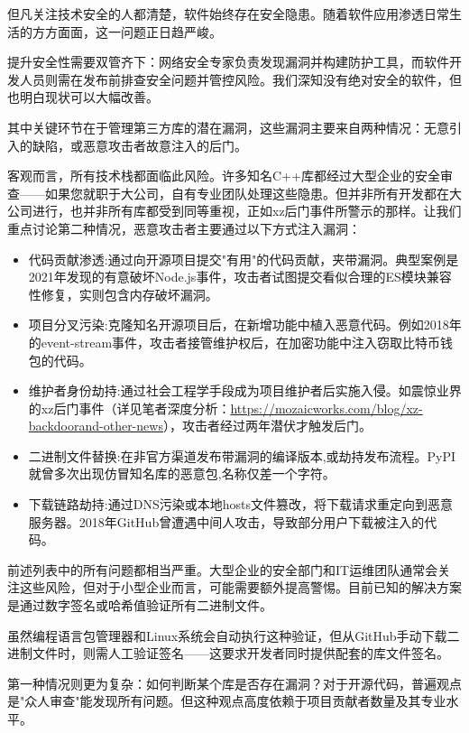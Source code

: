 
但凡关注技术安全的人都清楚，软件始终存在安全隐患。随着软件应用渗透日常生活的方方面面，这一问题正日趋严峻。

提升安全性需要双管齐下：网络安全专家负责发现漏洞并构建防护工具，而软件开发人员则需在发布前排查安全问题并管控风险。我们深知没有绝对安全的软件，但也明白现状可以大幅改善。

其中关键环节在于管理第三方库的潜在漏洞，这些漏洞主要来自两种情况：无意引入的缺陷，或恶意攻击者故意注入的后门。

客观而言，所有技术栈都面临此风险。许多知名C++库都经过大型企业的安全审查——如果您就职于大公司，自有专业团队处理这些隐患。但并非所有开发都在大公司进行，也并非所有库都受到同等重视，正如xz后门事件所警示的那样。让我们重点讨论第二种情况，恶意攻击者主要通过以下方式注入漏洞：

\begin{itemize}
\item 
代码贡献渗透:通过向开源项目提交"有用"的代码贡献，夹带漏洞。典型案例是2021年发现的有意破坏Node.js事件，攻击者试图提交看似合理的ES模块兼容性修复，实则包含内存破坏漏洞。

\item 
项目分叉污染:克隆知名开源项目后，在新增功能中植入恶意代码。例如2018年的event-stream事件，攻击者接管维护权后，在加密功能中注入窃取比特币钱包的代码。

\item 
维护者身份劫持:通过社会工程学手段成为项目维护者后实施入侵。如震惊业界的xz后门事件（详见笔者深度分析：\url{https://mozaicworks.com/blog/xz-backdoorand-other-news}），攻击者经过两年潜伏才触发后门。

\item 
二进制文件替换:在非官方渠道发布带漏洞的编译版本,或劫持发布流程。PyPI就曾多次出现仿冒知名库的恶意包,名称仅差一个字符。

\item 
下载链路劫持:通过DNS污染或本地hosts文件篡改，将下载请求重定向到恶意服务器。2018年GitHub曾遭遇中间人攻击，导致部分用户下载被注入的代码。
\end{itemize}

前述列表中的所有问题都相当严重。大型企业的安全部门和IT运维团队通常会关注这些风险，但对于小型企业而言，可能需要额外提高警惕。目前已知的解决方案是通过数字签名或哈希值验证所有二进制文件。

虽然编程语言包管理器和Linux系统会自动执行这种验证，但从GitHub手动下载二进制文件时，则需人工验证签名——这要求开发者同时提供配套的库文件签名。

第一种情况则更为复杂：如何判断某个库是否存在漏洞？对于开源代码，普遍观点是"众人审查"能发现所有问题。但这种观点高度依赖于项目贡献者数量及其专业水平。

